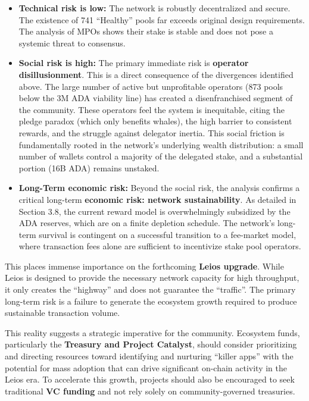 \documentclass[11pt, letterpaper]{article}
\begin{document}
\begin{itemize}
	\item \textbf{Technical risk is low:} The network is robustly decentralized and secure. The existence
	      of 741 ``Healthy'' pools far exceeds original design requirements. The analysis of MPOs shows their stake
	      is stable and does not pose a systemic threat to consensus.
	\item \textbf{Social risk is high:} The primary immediate risk is \textbf{operator disillusionment}.
	      This is a direct consequence of the divergences identified above. The large number of active but unprofitable
	      operators (873 pools below the 3M ADA viability line) has created a disenfranchised segment of the community.
	      These operators feel the system is inequitable, citing the pledge paradox (which only benefits whales), the
	      high barrier to consistent rewards, and the struggle against delegator inertia. This social friction is
	      fundamentally rooted in the network's underlying wealth distribution: a small number of wallets control a
	      majority of the delegated stake, and a substantial portion (16B ADA) remains unstaked.
	\item \textbf{Long-Term economic risk:} Beyond the social risk, the analysis confirms a critical
	      long-term \textbf{economic risk: network sustainability}. As detailed in Section 3.8, the current reward
	      model is overwhelmingly subsidized by the ADA reserves, which are on a finite depletion schedule. The
	      network's long-term survival is contingent on a successful transition to a fee-market model, where transaction
	      fees alone are sufficient to incentivize stake pool operators.
\end{itemize}

This places immense importance on the forthcoming \textbf{Leios upgrade}. While Leios is designed to provide the
necessary network capacity for high throughput, it only creates the ``highway'' and does not guarantee the ``traffic''.
The primary long-term risk is a failure to generate the ecosystem growth required to produce sustainable
transaction volume.

This reality suggests a strategic imperative for the community. Ecosystem funds, particularly
the \textbf{Treasury and Project Catalyst}, should consider prioritizing and directing resources
toward identifying and nurturing ``killer apps'' with the potential for mass adoption that
can drive significant on-chain activity in the Leios era. To accelerate this growth, projects should
also be encouraged to seek traditional \textbf{VC funding} and not rely solely on community-governed treasuries.
\end{document}

